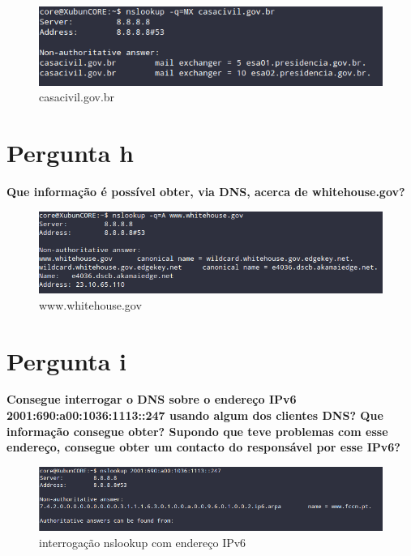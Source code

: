 \documentclass[a4paper]{report}
\begin{document}
\begin{figure}[H]
    \centering 
    \includegraphics[width=\textwidth]{images/casacivil_gov_br.png}  
    \caption{casacivil.gov.br}
    \label{fig:casacivil.gov.br}
\end{figure}

\section{Pergunta h}
\textbf{Que informação é possível obter, via DNS, acerca de whitehouse.gov?}
\begin{figure}[H]
    \centering 
    \includegraphics[width=\textwidth]{images/withehouse_gov.png}  
    \caption{www.whitehouse.gov}
    \label{fig:www.whitehouse.gov}
\end{figure}

\section{Pergunta i}
\textbf{Consegue interrogar o DNS sobre o endereço IPv6
2001:690:a00:1036:1113::247 usando algum dos clientes DNS? Que informação
consegue obter? Supondo que teve problemas com esse endereço, consegue obter um
contacto do responsável por esse IPv6?}
\begin{figure}[H]
    \centering 
    \includegraphics[width=\textwidth]{images/nslookup_ipv6.png}  
    \caption{interrogação nslookup com endereço IPv6}
    \label{fig:nslookup_ipv6}
\end{figure}
\end{document}
